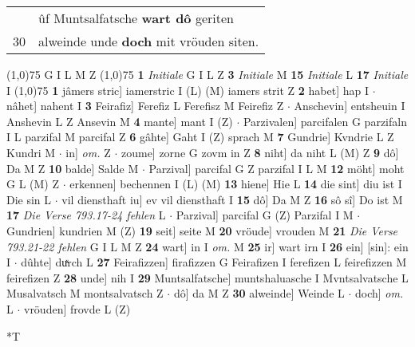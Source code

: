 \documentclass[8pt,a4paper,notitlepage]{article}
\begin{document}
\begin{table}[ht]
\begin{minipage}[t]{0.5\linewidth}
\begin{tabular}{rl}
 & ûf Muntsalfatsche \textbf{wart dô} geriten\\ 
30 & alweinde unde \textbf{doch} mit vröuden siten.\\ 
\end{tabular}
\scriptsize
\line(1,0){75} \newline
G I L M Z \newline
\line(1,0){75} \newline
\textbf{1} \textit{Initiale} G I L Z  \textbf{3} \textit{Initiale} M  \textbf{15} \textit{Initiale} L  \textbf{17} \textit{Initiale} I  \newline
\line(1,0){75} \newline
\textbf{1} jâmers stric] iamerstric I (L) (M) iamers strit Z \textbf{2} habet] hap I  $\cdot$ nâhet] nahent I \textbf{3} Feirafiz] Ferefiz L Ferefisz M Feirefiz Z  $\cdot$ Anschevin] entsheuin I Anshevin L Z Ansevin M \textbf{4} mante] mant I (Z)  $\cdot$ Parzivalen] parcifalen G parzifaln I L parzifal M parcifal Z \textbf{6} gâhte] Gaht I (Z) sprach M \textbf{7} Gundrie] Kvndrie L Z Kundri M  $\cdot$ in] \textit{om.} Z  $\cdot$ zoume] zorne G zovm in Z \textbf{8} niht] da niht L (M) Z \textbf{9} dô] Da M Z \textbf{10} balde] Salde M  $\cdot$ Parzival] parcifal G Z parzifal I L M \textbf{12} möht] moht G L (M) Z  $\cdot$ erkennen] bechennen I (L) (M) \textbf{13} hiene] Hie L \textbf{14} die sint] diu ist I Die sin L  $\cdot$ vil diensthaft iu] ev vil diensthaft I \textbf{15} dô] Da M Z \textbf{16} sô sî] Do ist M \textbf{17} \textit{Die Verse 793.17-24 fehlen} L   $\cdot$ Parzival] parcifal G (Z) Parzifal I M  $\cdot$ Gundrien] kundrien M (Z) \textbf{19} seit] seite M \textbf{20} vröude] vrouden M \textbf{21} \textit{Die Verse 793.21-22 fehlen} G I L M Z  \textbf{24} wart] in I \textit{om.} M \textbf{25} ir] wart irn I \textbf{26} ein] [sin]: ein I  $\cdot$ dûhte] duͯrch L \textbf{27} Feirafizzen] firafizzen G Feirafizen I ferefizen L feirefizzen M feirefizen Z \textbf{28} unde] nih I \textbf{29} Muntsalfatsche] muntshaluasche I Mvntsalvatsche L Musalvatsch M montsalvatsch Z  $\cdot$ dô] da M Z \textbf{30} alweinde] Weinde L  $\cdot$ doch] \textit{om.} L  $\cdot$ vröuden] frovde L (Z) \newline
\end{minipage}
\hspace{0.5cm}
\begin{minipage}[t]{0.5\linewidth}
\small
\begin{center}*T
\end{center}
\begin{tabular}{rl}

\end{tabular}
\end{minipage}
\end{table}
\end{document}
